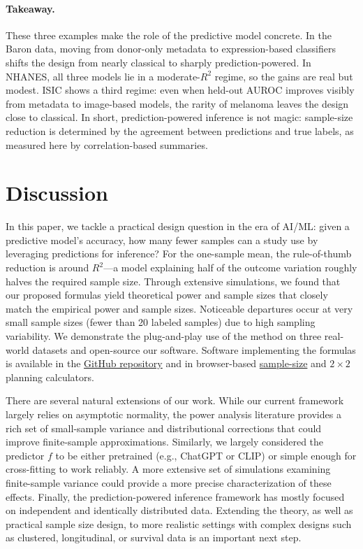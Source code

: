 \documentclass[12pt]{article}
\begin{document}
\paragraph{Takeaway.}
These three examples make the role of the predictive model concrete.
In the Baron data, moving from donor-only metadata to expression-based
classifiers shifts the design from nearly classical to sharply
prediction-powered.  In NHANES, all three models lie in a
moderate-$R^2$ regime, so the gains are real but modest.  ISIC shows a
third regime: even when held-out AUROC improves visibly from metadata
to image-based models, the rarity of melanoma leaves the design close
to classical. In short, prediction-powered inference is not magic:
sample-size reduction is determined by the agreement between
predictions and true labels, as measured here by correlation-based
summaries.

\section{Discussion}
\label{sec:discussion}

In this paper, we tackle a practical design question in the era of AI/ML: given a predictive model's
accuracy, how many fewer samples can a study use by leveraging predictions for inference?
For the one-sample mean, the rule-of-thumb reduction is around $R^2$---a model explaining half of the outcome variation roughly halves the required sample size. Through extensive simulations, we found that our proposed formulas yield theoretical power and sample sizes that closely match the empirical power and sample sizes.
Noticeable departures occur at very small sample sizes (fewer than 20 labeled samples) due to high sampling variability.
We demonstrate the plug-and-play use of the method on three real-world datasets and open-source our software.
Software implementing the formulas is available in the
\href{https://github.com/yiqunchen/pppower}{GitHub repository} and in browser-based
\href{https://yiqunchen.github.io/pppower/articles/sample-size-calculator.html}{sample-size}
and
\href{https://yiqunchen.github.io/pppower/articles/calculator-2x2.html}{$2\times 2$}
planning calculators.

There are several natural extensions of our work. While our current framework largely relies on asymptotic normality, the power analysis literature provides a rich set of small-sample variance and distributional corrections that could improve finite-sample approximations.
Similarly, we largely considered the predictor $f$ to be either pretrained (e.g., ChatGPT or CLIP) or simple enough for cross-fitting to work reliably.
A more extensive set of simulations examining finite-sample variance could provide a more precise characterization of these effects. Finally, the prediction-powered inference framework has mostly focused on independent and identically distributed data. Extending the theory, as well as practical sample size design, to more realistic settings with complex designs such as clustered, longitudinal, or survival data is an important next step.
\end{document}
